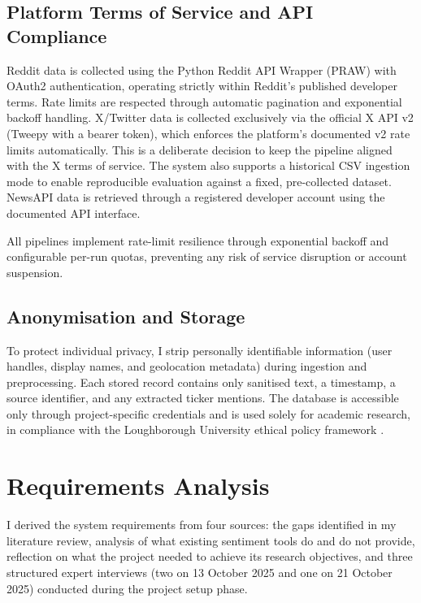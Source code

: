 \subsection{Platform Terms of Service and API Compliance}

Reddit data is collected using the Python Reddit API Wrapper (PRAW) with OAuth2 authentication, operating strictly within Reddit's published developer terms. Rate limits are respected through automatic pagination and exponential backoff handling. X/Twitter data is collected exclusively via the official X API v2 (Tweepy with a bearer token), which enforces the platform's documented v2 rate limits automatically. This is a deliberate decision to keep the pipeline aligned with the X terms of service. The system also supports a historical CSV ingestion mode to enable reproducible evaluation against a fixed, pre-collected dataset. NewsAPI data is retrieved through a registered developer account using the documented API interface.

All pipelines implement rate-limit resilience through exponential backoff and configurable per-run quotas, preventing any risk of service disruption or account suspension.

\subsection{Anonymisation and Storage}

To protect individual privacy, I strip personally identifiable information (user handles, display names, and geolocation metadata) during ingestion and preprocessing. Each stored record contains only sanitised text, a timestamp, a source identifier, and any extracted ticker mentions. The database is accessible only through project-specific credentials and is used solely for academic research, in compliance with the Loughborough University ethical policy framework \citep{lboro_ethics}.

\section{Requirements Analysis}
\label{sec:requirements_analysis}

I derived the system requirements from four sources: the gaps identified in my literature review, analysis of what existing sentiment tools do and do not provide, reflection on what the project needed to achieve its research objectives, and three structured expert interviews (two on 13 October 2025 and one on 21 October 2025) conducted during the project setup phase.

